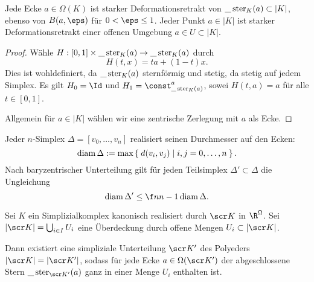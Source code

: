 \begin{st}
	Jede Ecke $a \in \Omega(K)$ ist starker Deformationsretrakt von $\_\operatorname{ster}_K(a) \subset |K|$, ebenso von $B(a, \eps)$ für $0 < \eps \le 1$.
	Jeder Punkt $a \in |K|$ ist starker Deformationsretrakt einer offenen Umgebung $a \in U \subset |K|$.
	\begin{proof}
		Wähle $H: [0,1] \times \_\operatorname{ster}_K(a) \to \_\operatorname{ster}_K(a)$ durch
		\[
			H(t, x) = ta + (1-t) x.
		\]
		Dies ist wohldefiniert, da $\_\operatorname{ster}_K(a)$ sternförmig und stetig, da stetig auf jedem Simplex.
		Es gilt $H_0 = \Id$ und $H_1 = \const_{\_\stern_K(a)}^a$, sowei $H(t,a) = a$ für alle $t \in [0,1]$.

		Allgemein für $a \in |K|$ wählen wir eine zentrische Zerlegung mit $a$ als Ecke.
	\end{proof}
\end{st}

\begin{lem}
	Jeder $n$-Simplex $\Delta = [v_0, \dotsc, v_n]$ realisiert seinen Durchmesser auf den Ecken:
	\[
		\operatorname{diam} \Delta := \max \Set{ d(v_i, v_j) | i,j = 0, \dotsc, n }.
	\]
	Nach baryzentrischer Unterteilung gilt für jeden Teilsimplex $\Delta' \subset \Delta$ die Ungleichung
	\[
		\diam \Delta' \le \f n{n-1} \diam \Delta.
	\]
\end{lem}

\begin{st}
	Sei $K$ ein Simplizialkomplex kanonisch realisiert durch $\scr K$ in $\R^\Omega$.
	Sei $|\scr K| = \bigcup_{i\in I} U_i$ eine Überdeckung durch offene Mengen $U_i \subset |\scr K|$.

	Dann existiert eine simpliziale Unterteilung $\scr K'$ des Polyeders $|\scr K| = |\scr K'|$, sodass für jede Ecke $a \in \Omega(\scr K')$ der abgeschlossene Stern $\_\stern_{\scr K'}(a)$ ganz in einer Menge $U_i$ enthalten ist.
\end{st}
